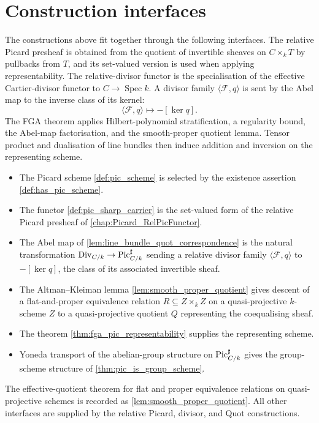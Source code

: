 \section{Construction interfaces}
\label{sec:fga_pic_lean_encoding}

The constructions above fit together through the following interfaces. The
relative Picard presheaf is obtained from the quotient of invertible sheaves
on \(C\times_kT\) by pullbacks from \(T\), and its set-valued version is used
when applying representability. The relative-divisor functor is the
specialisation of the effective Cartier-divisor functor to
\(C\to\operatorname{Spec}k\). A divisor family \(\langle\mathcal F,q\rangle\)
is sent by the Abel map to the inverse class of its kernel:
\[
  \langle\mathcal F,q\rangle\longmapsto-[\ker q].
\]
The FGA theorem applies Hilbert-polynomial stratification, a regularity bound,
the Abel-map factorisation, and the smooth-proper quotient lemma. Tensor
product and dualisation of line bundles then induce addition and inversion on
the representing scheme.

\begin{itemize}
  \item The Picard scheme \cref{def:pic_scheme} is selected by the
    existence assertion \cref{def:has_pic_scheme}.
  \item The functor \cref{def:pic_sharp_carrier} is the set-valued form of
    the relative Picard presheaf of \cref{chap:Picard_RelPicFunctor}.
  \item The Abel map of \cref{lem:line_bundle_quot_correspondence} is the natural
    transformation \(\mathrm{Div}_{C/k} \to \operatorname{Pic}^\sharp_{C/k}\) sending a
    relative divisor family \(\langle \mathcal F, q\rangle\) to
    \(-[\ker q]\), the class of its associated invertible sheaf.
  \item The Altman--Kleiman lemma \cref{lem:smooth_proper_quotient} gives
    descent of a flat-and-proper equivalence relation \(R \subseteq Z
    \times_k Z\) on a quasi-projective \(k\)-scheme \(Z\) to a
    quasi-projective quotient \(Q\) representing the coequalising sheaf.
  \item The theorem \cref{thm:fga_pic_representability} supplies the
    representing scheme.
  \item Yoneda transport of the abelian-group structure on
    \(\operatorname{Pic}^\sharp_{C/k}\) gives the group-scheme structure of
    \cref{thm:pic_is_group_scheme}.
\end{itemize}

The effective-quotient theorem for flat and proper equivalence relations on
quasi-projective schemes is recorded as
\cref{lem:smooth_proper_quotient}. All other interfaces are supplied by the
relative Picard, divisor, and Quot constructions.

